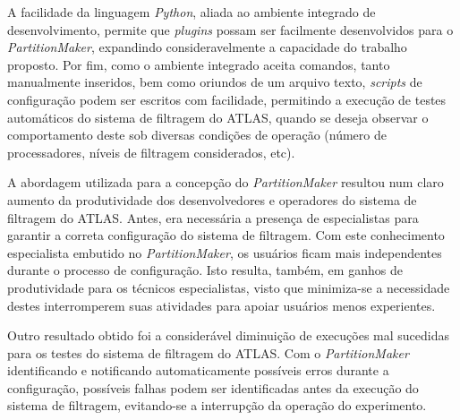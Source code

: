 A facilidade da linguagem \emph{Python}, aliada ao ambiente integrado de desenvolvimento, permite que \emph{plugins} possam ser facilmente desenvolvidos para o \emph{PartitionMaker},  expandindo consideravelmente a capacidade do trabalho proposto. Por fim, como o ambiente integrado aceita comandos, tanto manualmente inseridos, bem como oriundos de um arquivo texto, \emph{scripts} de configuração podem ser escritos com facilidade, permitindo a execução de testes automáticos do sistema de filtragem do ATLAS, quando se deseja observar o comportamento deste sob diversas condições de operação (número de processadores, níveis de filtragem considerados, etc).

A abordagem utilizada para a concepção do \emph{PartitionMaker} resultou num claro aumento da produtividade dos desenvolvedores e operadores do sistema de filtragem do ATLAS. Antes, era necessária a presença de especialistas para garantir a correta configuração do sistema de filtragem. Com este conhecimento especialista embutido no \emph{PartitionMaker}, os usuários ficam mais independentes durante o processo de configuração. Isto resulta, também, em ganhos de produtividade para os técnicos especialistas, visto que minimiza-se a necessidade destes interromperem suas atividades para apoiar usuários menos experientes.

Outro resultado obtido foi a considerável diminuição de execuções mal sucedidas para os testes do sistema de filtragem do ATLAS. Com o \emph{PartitionMaker} identificando e notificando automaticamente possíveis erros durante a configuração, possíveis falhas podem ser identificadas antes da execução do sistema de filtragem, evitando-se a interrupção da operação do experimento.
